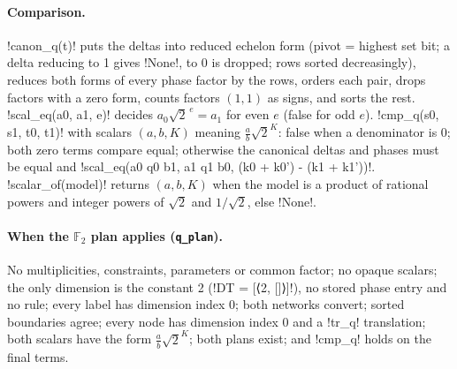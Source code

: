 {{{\paragraph{Comparison.} \lexpy!canon_q(t)! puts the deltas into reduced echelon form (pivot = highest
set bit; a delta reducing to 1 gives \lexpy!None!, to 0 is dropped; rows sorted decreasingly),
reduces both forms of every phase factor by the rows, orders each pair, drops factors with a
zero form, counts factors $(1,1)$ as signs, and sorts the rest. \lexpy!scal_eq(a0, a1, e)! decides
$a_0\sqrt2^{\,e} = a_1$ for even $e$ (false for odd $e$). \lexpy!cmp_q(s0, s1, t0, t1)! with scalars
$(a, b, K)$ meaning $\tfrac{a}{b}\sqrt2^{K}$: false when a denominator is 0; both zero terms
compare equal; otherwise the canonical deltas and phases must be equal and
\lexpy!scal_eq(a0 q0 b1, a1 q1 b0, (k0 + k0') - (k1 + k1'))!. \lexpy!scalar_of(model)! returns
$(a, b, K)$ when the model is a product of rational powers and integer powers of $\sqrt2$ and
$1/\sqrt2$, else \lexpy!None!.

\paragraph{When the $\mathbb{F}_2$ plan applies (\texttt{q\_plan}).} No multiplicities, constraints,
parameters or common factor; no opaque scalars; the only dimension is the constant 2
(\lexlean!DT = [⟨2, []⟩]!), no stored phase entry and no rule; every label has dimension index 0;
both networks convert; sorted boundaries agree; every node has dimension index 0 and a \lexpy!tr_q!
translation; both scalars have the form $\tfrac ab\sqrt2^{K}$; both plans exist; and \lexpy!cmp_q!
holds on the final terms.

}}}
